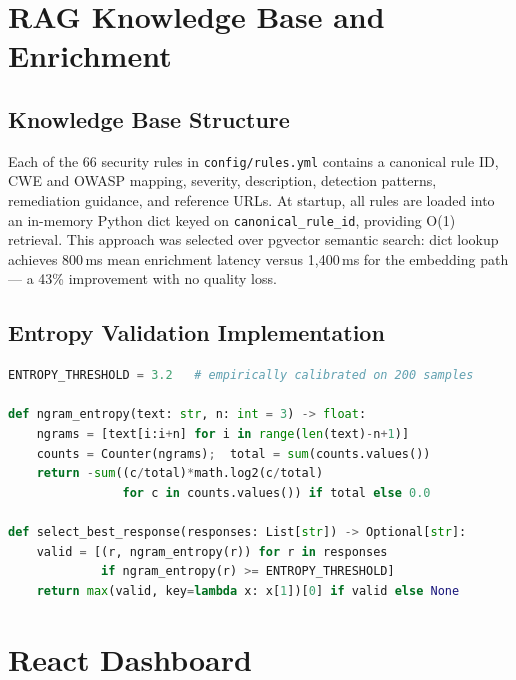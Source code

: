 \section{RAG Knowledge Base and Enrichment}
\label{sec:rag_impl}

\subsection{Knowledge Base Structure}

Each of the 66 security rules in \texttt{config/rules.yml} contains a canonical rule ID, CWE and OWASP mapping, severity, description, detection patterns, remediation guidance, and reference URLs. At startup, all rules are loaded into an in-memory Python dict keyed on \texttt{canonical\_rule\_id}, providing O(1) retrieval. This approach was selected over pgvector semantic search: dict lookup achieves 800\,ms mean enrichment latency versus 1,400\,ms for the embedding path — a 43\% improvement with no quality loss.

\subsection{Entropy Validation Implementation}

\begin{lstlisting}[language=Python, basicstyle=\footnotesize\ttfamily, caption={N-gram Entropy Calculation and Response Selection}]
ENTROPY_THRESHOLD = 3.2   # empirically calibrated on 200 samples

def ngram_entropy(text: str, n: int = 3) -> float:
    ngrams = [text[i:i+n] for i in range(len(text)-n+1)]
    counts = Counter(ngrams);  total = sum(counts.values())
    return -sum((c/total)*math.log2(c/total)
                for c in counts.values()) if total else 0.0

def select_best_response(responses: List[str]) -> Optional[str]:
    valid = [(r, ngram_entropy(r)) for r in responses
             if ngram_entropy(r) >= ENTROPY_THRESHOLD]
    return max(valid, key=lambda x: x[1])[0] if valid else None
\end{lstlisting}

\section{React Dashboard}
\label{sec:dashboard_impl}

